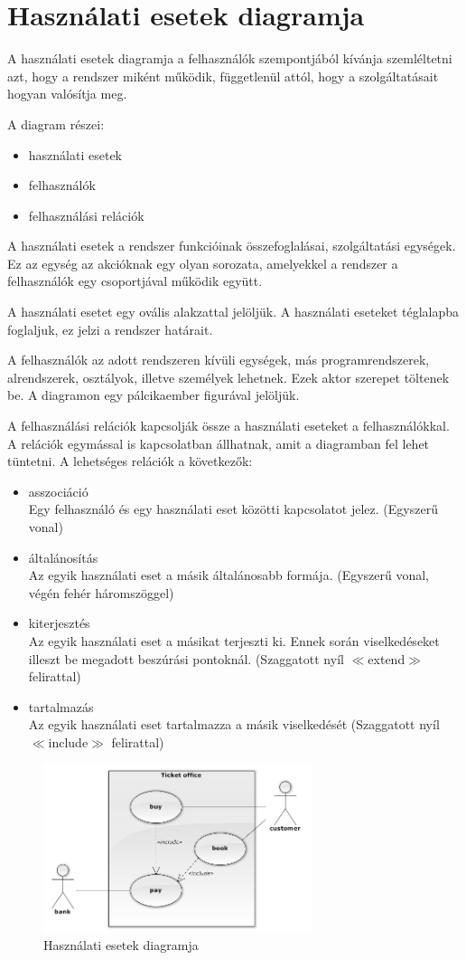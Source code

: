 \documentclass[margin=0px]{article}
\begin{document}
\section{Használati esetek diagramja}
A használati esetek diagramja a felhasználók szempontjából kívánja
szemléltetni azt, hogy a rendszer miként működik, függetlenül attól,
hogy a szolgáltatásait hogyan valósítja meg.

\noindent
A diagram részei:
\begin{itemize}
    \item használati esetek
    \item felhasználók
    \item felhasználási relációk
\end{itemize}

A használati esetek a rendszer funkcióinak összefoglalásai, szolgáltatási
egységek. Ez az egység az akcióknak egy olyan sorozata, amelyekkel
a rendszer a felhasználók egy csoportjával működik együtt.

A használati esetet egy ovális alakzattal jelöljük. A használati eseteket téglalapba foglaljuk, ez jelzi a rendszer határait.

A felhasználók az adott rendszeren kívüli egységek, más programrendszerek,
alrendszerek, osztályok, illetve személyek lehetnek. Ezek
aktor szerepet töltenek be. A diagramon egy pálcikaember figurával jelöljük.

A felhasználási relációk kapcsolják össze a használati eseteket a
felhasználókkal. A relációk egymással is kapcsolatban állhatnak, amit
a diagramban fel lehet tüntetni. A lehetséges relációk a következők:
\begin{itemize}
    \item asszociáció \\
          Egy felhasználó és egy használati eset közötti kapcsolatot jelez. (Egyszerű vonal)
    \item általánosítás \\
          Az egyik használati eset a másik általánosabb formája. (Egyszerű vonal, végén fehér háromszöggel)
    \item kiterjesztés \\
          Az egyik használati eset a másikat terjeszti ki. Ennek
          során viselkedéseket illeszt be megadott beszúrási pontoknál. (Szaggatott nyíl $\ll$extend$\gg$ felirattal)
    \item tartalmazás \\
          Az egyik használati eset tartalmazza a másik viselkedését  (Szaggatott nyíl $\ll$include$\gg$ felirattal)
\end{itemize}

\begin{figure}[H]
    \centering
    \includegraphics[width=0.7\textwidth]{img/hasznalatieset.png}
    \caption{Használati esetek diagramja}
\end{figure}
\end{document}
